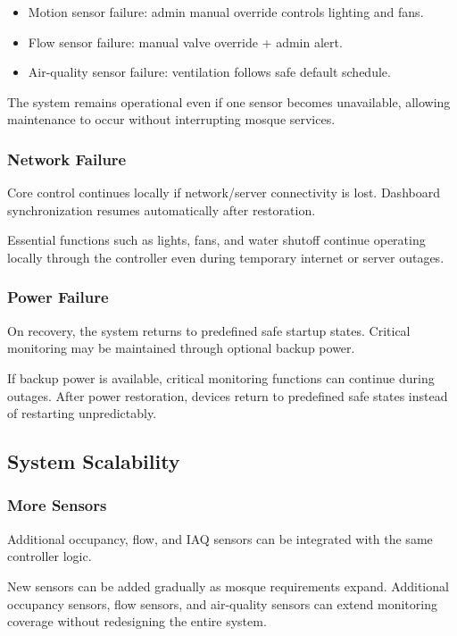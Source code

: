 \begin{itemize}
  \item Motion sensor failure: admin manual override controls lighting and fans.
  \item Flow sensor failure: manual valve override + admin alert.
  \item Air-quality sensor failure: ventilation follows safe default schedule.
\end{itemize}

The system remains operational even if one sensor becomes unavailable, allowing maintenance to occur without interrupting mosque services.

\subsubsection{Network Failure}
Core control continues locally if network/server connectivity is lost. Dashboard synchronization resumes automatically after restoration.

Essential functions such as lights, fans, and water shutoff continue operating locally through the controller even during temporary internet or server outages.

\subsubsection{Power Failure}
On recovery, the system returns to predefined safe startup states. Critical monitoring may be maintained through optional backup power.

If backup power is available, critical monitoring functions can continue during outages. After power restoration, devices return to predefined safe states instead of restarting unpredictably.

\subsection{System Scalability}

\subsubsection{More Sensors}
Additional occupancy, flow, and IAQ sensors can be integrated with the same controller logic.

New sensors can be added gradually as mosque requirements expand. Additional occupancy sensors, flow sensors, and air-quality sensors can extend monitoring coverage without redesigning the entire system.

